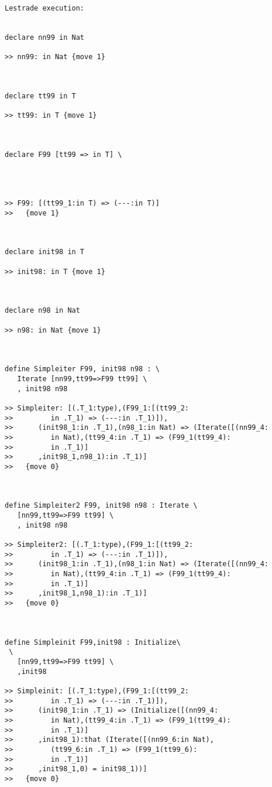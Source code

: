 \documentclass[12pt]{article}
\begin{document}
\begin{verbatim}Lestrade execution:


declare nn99 in Nat

>> nn99: in Nat {move 1}



declare tt99 in T

>> tt99: in T {move 1}



declare F99 [tt99 => in T] \
   



>> F99: [(tt99_1:in T) => (---:in T)]
>>   {move 1}



declare init98 in T

>> init98: in T {move 1}



declare n98 in Nat

>> n98: in Nat {move 1}



define Simpleiter F99, init98 n98 : \
   Iterate [nn99,tt99=>F99 tt99] \
   , init98 n98

>> Simpleiter: [(.T_1:type),(F99_1:[(tt99_2:
>>         in .T_1) => (---:in .T_1)]),
>>      (init98_1:in .T_1),(n98_1:in Nat) => (Iterate([(nn99_4:
>>         in Nat),(tt99_4:in .T_1) => (F99_1(tt99_4):
>>         in .T_1)]
>>      ,init98_1,n98_1):in .T_1)]
>>   {move 0}



define Simpleiter2 F99, init98 n98 : Iterate \
   [nn99,tt99=>F99 tt99] \
   , init98 n98

>> Simpleiter2: [(.T_1:type),(F99_1:[(tt99_2:
>>         in .T_1) => (---:in .T_1)]),
>>      (init98_1:in .T_1),(n98_1:in Nat) => (Iterate([(nn99_4:
>>         in Nat),(tt99_4:in .T_1) => (F99_1(tt99_4):
>>         in .T_1)]
>>      ,init98_1,n98_1):in .T_1)]
>>   {move 0}



define Simpleinit F99,init98 : Initialize\
 \
   [nn99,tt99=>F99 tt99] \
   ,init98

>> Simpleinit: [(.T_1:type),(F99_1:[(tt99_2:
>>         in .T_1) => (---:in .T_1)]),
>>      (init98_1:in .T_1) => (Initialize([(nn99_4:
>>         in Nat),(tt99_4:in .T_1) => (F99_1(tt99_4):
>>         in .T_1)]
>>      ,init98_1):that (Iterate([(nn99_6:in Nat),
>>         (tt99_6:in .T_1) => (F99_1(tt99_6):
>>         in .T_1)]
>>      ,init98_1,0) = init98_1))]
>>   {move 0}




\end{verbatim}
\end{document}
